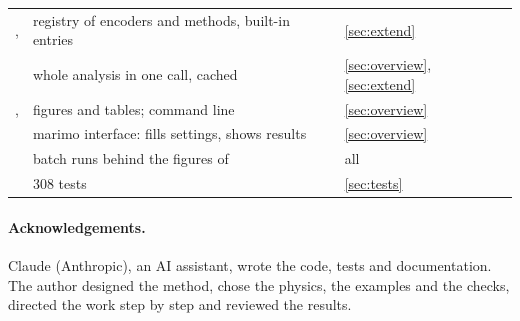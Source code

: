 \documentclass[11pt,a4paper]{article}
\newcommand{\repo}{https://github.com/Lu-Dumoulin/PhaseWall}
\newcommand{\srcref}[1]{\href{\repo/blob/main/#1}{\texttt{\detokenize{#1}}}}
\newcommand{\code}[1]{\texttt{\detokenize{#1}}}
\begin{document}
\begin{table}[H]
\begin{tabular}{@{}>{\raggedright}p{5.2cm}>{\raggedright}p{6.6cm}l@{}}
\srcref{src/phasewall/registry.py}, \srcref{src/phasewall/builtins.py} & registry of encoders and methods, built-in entries & \ref{sec:extend} \\
\srcref{src/phasewall/pipeline.py} & whole analysis in one call, cached & \ref{sec:overview}, \ref{sec:extend} \\
\srcref{src/phasewall/report.py}, \srcref{src/phasewall/cli.py} & figures and tables; command line & \ref{sec:overview} \\
\srcref{apps/explore.py} & marimo interface: fills settings, shows results & \ref{sec:overview} \\
\srcref{scripts/} & batch runs behind the figures of \code{docs/} & all \\
\srcref{tests/} & 308 tests & \ref{sec:tests} \\
\bottomrule
\end{tabular}
\end{table}

\paragraph{Acknowledgements.}
Claude (Anthropic), an AI assistant, wrote the code, tests and documentation. The author designed the
method, chose the physics, the examples and the checks, directed the work step by step and reviewed
the results.
\end{document}
